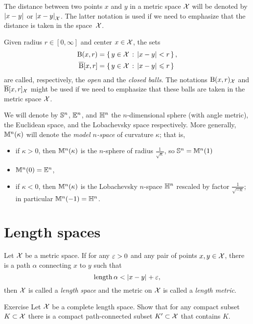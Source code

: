 The distance between two points $x$ and $y$ in a metric space $\mathcal{X}$ will be denoted by $|{x}-{y}|_{}^{{}}$ or $|{x}-{y}|_{\mathcal{X}}^{{}}$.\label{page:|x-y|X}
The latter notation is used if we need to emphasize 
that the distance is taken in the space~${\mathcal{X}}$.

Given radius $r\in[0,\infty]$ and center $x\in \mathcal{X}$, the sets
\begin{align*}
\mathrm{B}{}(x,r)&=\left\{\,{y\in \mathcal{X}}\,:\,{|{x}-{y}|_{}^{{}}<r}\,\right\},
\\
\overline{\mathrm{B}}{}[x,r]&=\left\{\,{y\in \mathcal{X}}\,:\,{|{x}-{y}|_{}^{{}}\leqslant r}\,\right\}
\end{align*}
are called, respectively, the \emph{open} and  the \emph{closed  balls}.
The notations $\mathrm{B}{}(x,r)_{\mathcal{X}}$ and $\overline{\mathrm{B}}{}[x,r]_{\mathcal{X}}$
might be used if we need to emphasize that these balls are taken in the metric space $\mathcal{X}$.

We will denote by $\mathbb{S}^n$, $\mathbb{E}^n$, and $\mathbb{H}^n$ the $n$-dimensional sphere (with angle metric),
the Euclidean space, and the Lobachevsky space respectively.
More generally, $\mathbb{M}^n(\kappa)$ will denote the \emph{model $n$-space} of curvature $\kappa$;
that is,
\begin{itemize}
\item if $\kappa>0$, then $\mathbb{M}^n(\kappa)$ is the $n$-sphere of radius $\tfrac{1}{\sqrt{\kappa}}$, so $\mathbb{S}^n=\mathbb{M}^n(1)$
\item $\mathbb{M}^n(0)=\mathbb{E}^n$,
\item if $\kappa<0$, then $\mathbb{M}^n(\kappa)$ is the Lobachevsky $n$-space $\mathbb{H}^n$ rescaled by factor $\tfrac{1}{\sqrt{-\kappa}}$;
in particular $\mathbb{M}^n(-1)=\mathbb{H}^n$.
\end{itemize}

\section{Length spaces}\label{sec:length}

Let $\mathcal{X}$ be a metric space.
If for any $\varepsilon>0$ and any pair of points $x,y\in\mathcal{X}$, there is a path $\alpha$ connecting $x$ to $y$ such that
\[\mathop{\rm length}\nolimits\alpha< |{x}-{y}|_{}^{{}}+\varepsilon,\]
then $\mathcal{X}$ is called a \emph{length space} and the metric on $\mathcal{X}$ is called a \emph{length metric}.\label{page:length metric}

\begin{thm}{Exercise}\label{ex:compact+connceted}
Let $\mathcal{X}$ be a complete length space.
Show that for any compact subset $K\subset\mathcal{X}$
there is a compact path-connected subset $K'\subset\mathcal{X}$ that contains $K$.  
\end{thm}

